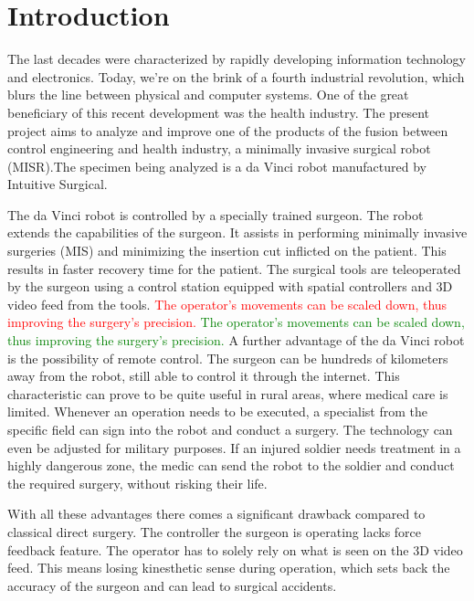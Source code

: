 
%
	
\chapter{Introduction}

The last decades were characterized by rapidly developing information technology and electronics. Today, we're on the brink of a fourth industrial revolution, which blurs the line between physical and computer systems. One of the great beneficiary of this recent development was the health industry. The present project aims to analyze and improve one of the products of the fusion between control engineering and health industry, a minimally invasive surgical robot (MISR).The specimen being analyzed is a da Vinci robot manufactured by Intuitive Surgical.

The da Vinci robot is controlled by a specially trained surgeon. The robot extends the capabilities of the surgeon. It assists in performing minimally invasive surgeries (MIS) and minimizing the insertion cut inflicted on the patient.
This results in faster recovery time for the patient\cite{rec_time}. The surgical tools are teleoperated by the surgeon using a control station equipped with spatial controllers and 3D video feed from the tools. \textcolor{red}{The operator's movements can be scaled down, thus improving the surgery's precision.} \textcolor{green}{The operator's movements can be scaled down, thus improving the surgery's precision.} A further advantage of the da Vinci robot is the possibility of remote control. The surgeon can be hundreds of kilometers away from the robot, still able to control it through the internet. This characteristic can prove to be quite useful in rural areas, where medical care is limited. Whenever an operation needs to be executed, a specialist from the specific field can sign into the robot and conduct a surgery. The technology can even be adjusted for military purposes. If an injured soldier needs treatment in a highly dangerous zone, the medic can send the robot to the soldier and conduct the required surgery, without risking their life.

With all these advantages there comes a significant drawback compared to classical direct surgery. The controller the surgeon is operating lacks force feedback feature\cite{lack_fb}. The operator has to solely rely on what is seen on the 3D video feed. This means losing kinesthetic sense during operation, which sets back the accuracy of the surgeon and can lead to surgical accidents. 

